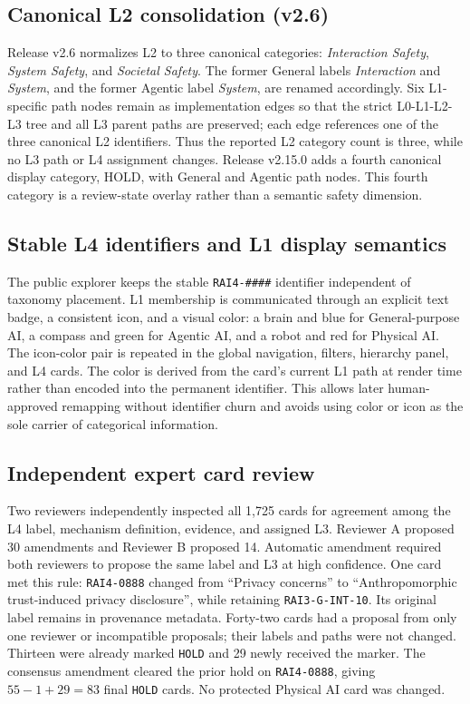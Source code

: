 \documentclass[11pt,a4paper]{article}
\newcommand{\code}[1]{\texttt{#1}}
\begin{document}
\begin{appendices}
\subsection{Canonical L2 consolidation (v2.6)}

Release v2.6 normalizes L2 to three canonical categories:
\textit{Interaction Safety}, \textit{System Safety}, and \textit{Societal
Safety}. The former General labels \textit{Interaction} and \textit{System},
and the former Agentic label \textit{System}, are renamed accordingly. Six
L1-specific path nodes remain as implementation edges so that the strict
L0-L1-L2-L3 tree and all L3 parent paths are preserved; each
edge references one of the three canonical L2 identifiers. Thus the reported
L2 category count is three, while no L3 path or L4 assignment changes. Release
v2.15.0 adds a fourth canonical display category, HOLD, with General and
Agentic path nodes. This fourth category is a review-state overlay rather than
a semantic safety dimension.

\subsection{Stable L4 identifiers and L1 display semantics}

The public explorer keeps the stable \code{RAI4-\#\#\#\#} identifier independent
of taxonomy placement. L1 membership is communicated through an explicit text
badge, a consistent icon, and a visual color: a brain and blue for
General-purpose AI, a compass and green for Agentic AI, and a robot and red for
Physical AI. The icon-color pair is repeated in the global navigation,
filters, hierarchy panel, and L4 cards. The color is derived from the card's current L1
path at render time rather than encoded into the permanent identifier. This
allows later human-approved remapping without identifier churn and avoids using
color or icon as the sole carrier of categorical information.

\subsection{Independent expert card review}

Two reviewers independently inspected all 1,725 cards for agreement among the
L4 label, mechanism definition, evidence, and assigned L3. Reviewer A proposed
30 amendments and Reviewer B proposed 14. Automatic amendment required both
reviewers to propose the same label and L3 at high confidence. One card met this
rule: \code{RAI4-0888} changed from ``Privacy concerns'' to
``Anthropomorphic trust-induced privacy disclosure'', while retaining
\code{RAI3-G-INT-10}. Its original label remains in provenance metadata.
Forty-two cards had a proposal from only one reviewer or incompatible proposals;
their labels and paths were not changed. Thirteen were already marked \code{HOLD}
and 29 newly received the marker. The consensus amendment cleared the prior hold
on \code{RAI4-0888}, giving $55-1+29=83$ final \code{HOLD} cards. No protected
Physical AI card was changed.


\end{appendices}
\end{document}
